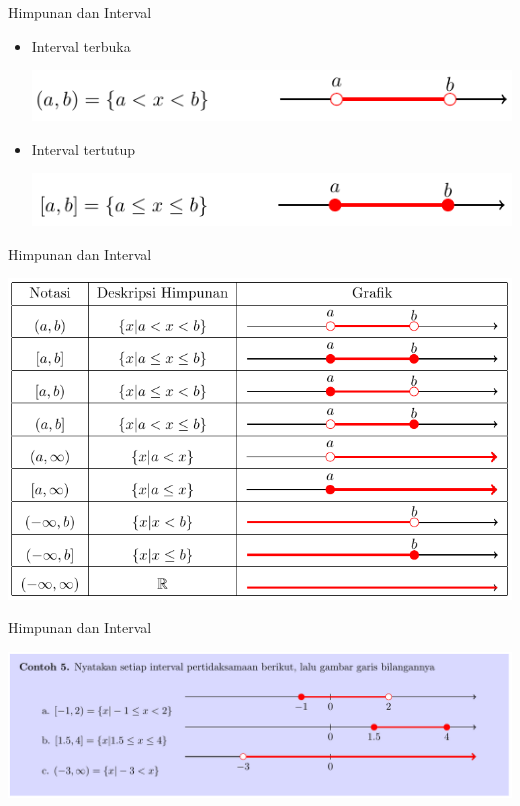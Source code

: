 \documentclass[pdflatex,compress,mathserif]{beamer}
\begin{document}
\begin{frame}{Himpunan dan Interval}
	\begin{itemize}
		\item Interval terbuka
		\begin{center}
			\includegraphics[width=\linewidth]{img/img14}
		\end{center}
		\item Interval tertutup
		\begin{center}
			\includegraphics[width=\linewidth]{img/img15}
		\end{center}
	\end{itemize}
\end{frame}

\begin{frame}{Himpunan dan Interval}
	\begin{center}
		\includegraphics[width=0.9\linewidth]{img/img16}
	\end{center}
\end{frame}

\begin{frame}{Himpunan dan Interval}
	\begin{center}
		\includegraphics[width=\linewidth]{img/img17}
	\end{center}
\end{frame}
\end{document}
